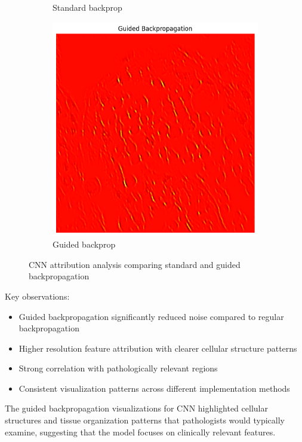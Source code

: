 \documentclass[10pt,twocolumn]{article}
\begin{document}
\begin{figure}[h]
\begin{subfigure}{0.32\columnwidth}
\caption{Standard backprop}
\end{subfigure}
\hfill
\begin{subfigure}{0.32\columnwidth}
\includegraphics[width=\linewidth]{imgs/cnn_gbp.png}
\caption{Guided backprop}
\end{subfigure}
\caption{CNN attribution analysis comparing standard and guided backpropagation}
\label{fig:cnn_attribution}
\end{figure}

Key observations:
\begin{itemize}
    \item Guided backpropagation significantly reduced noise compared to regular backpropagation
    \item Higher resolution feature attribution with clearer cellular structure patterns
    \item Strong correlation with pathologically relevant regions
    \item Consistent visualization patterns across different implementation methods
\end{itemize}

The guided backpropagation visualizations for CNN highlighted cellular structures and tissue organization patterns that pathologists would typically examine, suggesting that the model focuses on clinically relevant features.
\end{document}
